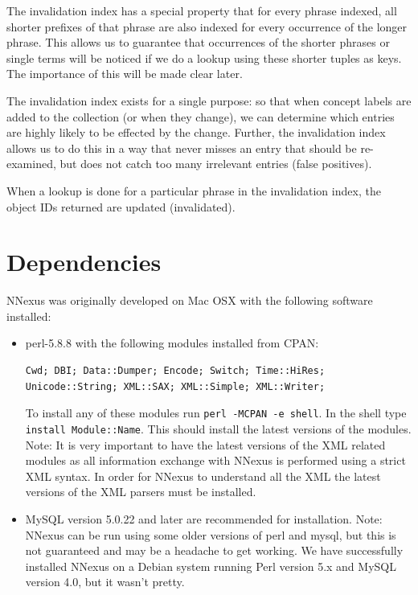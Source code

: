 \documentclass{article}
\begin{document}
The invalidation index has a special property that for every phrase indexed, all shorter prefixes of that phrase are also indexed for every occurrence of the longer phrase.  This allows us to guarantee that occurrences of the shorter phrases or single terms will be noticed if we do a lookup using these shorter tuples as keys.  The importance of this will be made clear later.

The invalidation index exists for a single purpose: so that when concept labels are added to the collection (or when they change), we can determine which entries are highly likely to be effected by the change.  Further, the invalidation index allows us to do this in a way that never misses an entry that should be re-examined, but does not catch too many irrelevant entries (false positives).

When a lookup is done for a particular phrase in the invalidation index, the object IDs returned are updated (invalidated).


\section{Dependencies}
NNexus was originally developed on Mac OSX with the following software installed:
\begin{itemize}
\item perl-5.8.8 with the following modules installed from CPAN:
\begin{verbatim}
Cwd; DBI; Data::Dumper; Encode; Switch; Time::HiRes;
Unicode::String; XML::SAX; XML::Simple; XML::Writer;
\end{verbatim}
To install any of these modules run \texttt{perl -MCPAN -e shell}. In the shell type \texttt{install Module::Name}. This should install the latest versions of the modules. Note: It is very important to have the latest versions of the XML related modules as all information exchange with NNexus is performed using a strict XML syntax. In order for NNexus to understand all the XML the latest versions of the XML parsers must be installed.

\item
MySQL version 5.0.22 and later are recommended for installation. Note:
NNexus can be run using some older versions of perl and mysql, but this is not guaranteed and may be a headache to get working. We have successfully installed NNexus on a Debian system running Perl version 5.x and MySQL version 4.0, but it wasn't pretty.
\end{itemize}
\end{document}
